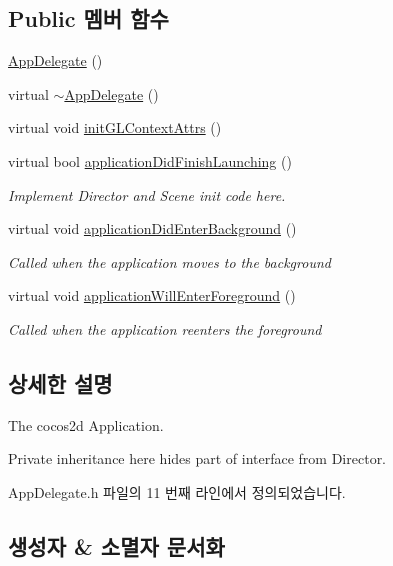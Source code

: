 \subsection*{Public 멤버 함수}
\begin{DoxyCompactItemize}
\item 
\hyperlink{class_app_delegate_a7d26ade6fbc9d35ecc9185792303f82d}{App\+Delegate} ()
\item 
virtual \hyperlink{class_app_delegate_a9f89424b5e296e3668deaa0265fc5ac1}{$\sim$\+App\+Delegate} ()
\item 
virtual void \hyperlink{class_app_delegate_a2de4e8ab7d04bde311684e1d4ceb2c0f}{init\+G\+L\+Context\+Attrs} ()
\item 
virtual bool \hyperlink{class_app_delegate_a68cbaed49edf7581dc59a09d5062fff3}{application\+Did\+Finish\+Launching} ()
\begin{DoxyCompactList}\small\item\em Implement Director and Scene init code here. \end{DoxyCompactList}\item 
virtual void \hyperlink{class_app_delegate_a17cb09777419781698324e0415bffd3a}{application\+Did\+Enter\+Background} ()
\begin{DoxyCompactList}\small\item\em Called when the application moves to the background \end{DoxyCompactList}\item 
virtual void \hyperlink{class_app_delegate_ac4d653e3f74a91efef5f2def58fe3108}{application\+Will\+Enter\+Foreground} ()
\begin{DoxyCompactList}\small\item\em Called when the application reenters the foreground \end{DoxyCompactList}\end{DoxyCompactItemize}


\subsection{상세한 설명}
The cocos2d Application. 

Private inheritance here hides part of interface from Director. 

App\+Delegate.\+h 파일의 11 번째 라인에서 정의되었습니다.



\subsection{생성자 \& 소멸자 문서화}
\mbox{\label{class_app_delegate_a7d26ade6fbc9d35ecc9185792303f82d}} 
